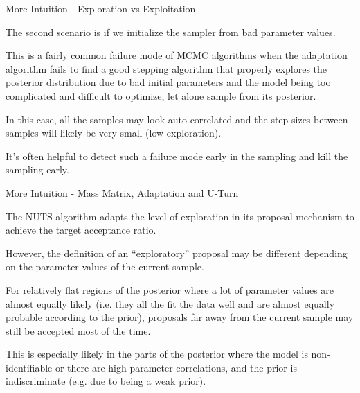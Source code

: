 \begin{frame}{More Intuition - Exploration vs Exploitation}
	\begin{vfilleditems}
		\item The second scenario is if we initialize the sampler from bad parameter values.
			\begin{vfilleditems}
				\item This is a fairly common failure mode of MCMC algorithms when the adaptation algorithm fails to find a good stepping algorithm that properly explores the posterior distribution due to bad initial parameters and the model being too complicated and difficult to optimize, let alone sample from its posterior.
				\item In this case, all the samples may look auto-correlated and the step sizes between samples will likely be very small (low exploration).
				\item It's often helpful to detect such a failure mode early in the sampling and kill the sampling early.
			\end{vfilleditems}
	\end{vfilleditems}
\end{frame}
\begin{frame}{More Intuition - Mass Matrix, Adaptation and U-Turn}
	\begin{vfilleditems}
		\item The NUTS algorithm adapts the level of exploration in its proposal mechanism to achieve the target acceptance ratio.
		\item However, the definition of an ``exploratory'' proposal may be different depending on the parameter values of the current sample.
		\item For relatively flat regions of the posterior where a lot of parameter values are almost equally likely (i.e. they all the fit the data well and are almost equally probable according to the prior), proposals far away from the current sample may still be accepted most of the time.
		\item This is especially likely in the parts of the posterior where the model is non-identifiable or there are high parameter correlations, and the prior is indiscriminate (e.g. due to being a weak prior).
	\end{vfilleditems}
\end{frame}

